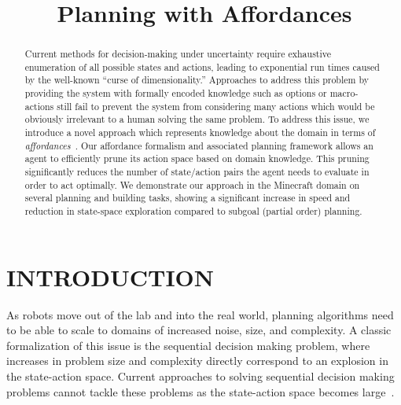 \documentclass[]{article}
\title{Planning with Affordances}
\newcommand{\stnote}[1]{\textcolor{Blue}{\textbf{ST: #1}}}
\begin{document}
\author{}
\maketitle

\begin{abstract}
Current methods for decision-making under uncertainty require
exhaustive enumeration of all possible states and actions, leading to
exponential run times caused by the well-known ``curse of
dimensionality.''  Approaches to address this problem by providing the
system with formally encoded knowledge such as options or
macro-actions still fail to prevent the system from considering many
actions which would be obviously irrelevant to a human solving the
same problem.  To address this issue, we introduce a novel approach
which represents knowledge about the domain in terms of {\em
  affordances}~\citep{gibson77}.  Our affordance formalism and
associated planning framework allows an agent to efficiently prune its
action space based on domain knowledge.  This pruning significantly
reduces the number of state/action pairs the agent needs to evaluate
in order to act optimally.  We demonstrate our approach in the
Minecraft domain on several planning and building tasks, showing a
significant increase in speed and reduction in state-space exploration
compared to subgoal (partial order) planning.
\end{abstract}


\section{INTRODUCTION}

As robots move out of the lab and into the real world, planning
algorithms need to be able to scale to domains of increased noise,
size, and complexity.  A classic formalization of this issue is the
sequential decision making problem, where increases in problem size
and complexity directly correspond to an explosion in the state-action
space. Current approaches to solving sequential decision making
problems cannot tackle these problems as the state-action space
becomes large~\citep{grounds05}.
\end{document}
